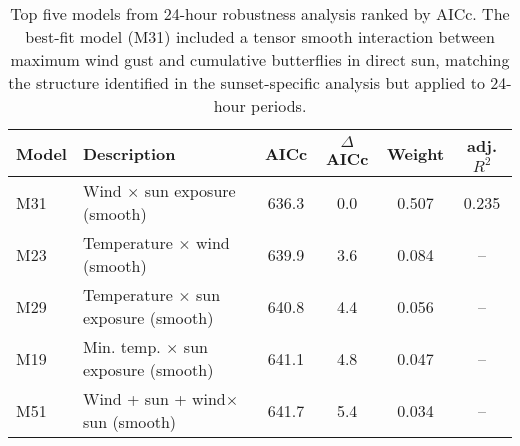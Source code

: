 \begin{table}[htbp]
\centering
\caption[Top models from 24-hour robustness analysis]{Top five models from 24-hour robustness analysis ranked by AICc. The best-fit model (M31) included a tensor smooth interaction between maximum wind gust and cumulative butterflies in direct sun, matching the structure identified in the sunset-specific analysis but applied to 24-hour periods.}
\label{tab:24hr-model-selection-table}
\begin{tabularx}{\textwidth}{lXcccc}
\toprule
Model & Description & AICc & $\Delta$AICc & Weight & adj. $R^2$ \\
\midrule
M31 & Wind $\times$ sun exposure (smooth) & 636.3 & 0.0 & 0.507 & 0.235 \\
M23 & Temperature $\times$ wind (smooth) & 639.9 & 3.6 & 0.084 & -- \\
M29 & Temperature $\times$ sun exposure (smooth) & 640.8 & 4.4 & 0.056 & -- \\
M19 & Min. temp. $\times$ sun exposure (smooth) & 641.1 & 4.8 & 0.047 & -- \\
M51 & Wind + sun + wind$\times$sun (smooth) & 641.7 & 5.4 & 0.034 & -- \\
\bottomrule
\end{tabularx}
\end{table}